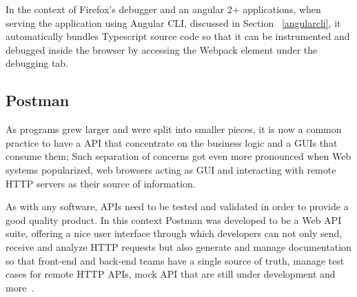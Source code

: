 In the context of Firefox's debugger and an angular 2+ applications, when serving the application using Angular \gls{CLI}, discussed in Section ~\ref{angularcli}, it automatically bundles Typescript source code so that it can be instrumented and debugged inside the browser by accessing the Webpack element under the debugging tab.

\subsection{Postman}
As programs grew larger and were split into smaller pieces, it is now a common practice to have a \gls{API} that concentrate on the business logic and a \gls{GUI}s that consume them; Such separation of concerns got even more pronounced when Web systems popularized, web browsers acting as \gls{GUI} and interacting with remote \gls{HTTP} servers as their source of information.

As with any software, \gls{API}s need to be tested and validated in order to provide a good quality product. In this context Postman was developed to be a Web \gls{API} suite, offering a nice user interface through which developers can not only send, receive and analyze \gls{HTTP} requests but also generate and manage documentation so that front-end and back-end teams have a single source of truth, manage test cases for remote \gls{HTTP} \gls{API}s, mock \gls{API} that are still under development and more~\cite{postman}.